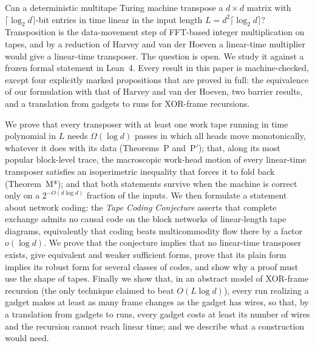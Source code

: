 Can a deterministic multitape Turing machine transpose a $d\times d$ matrix with $\lceil\log_2d\rceil$-bit
entries in time linear in the input length $L=d^2\lceil\log_2d\rceil$? Transposition is the data-movement step of FFT-based integer multiplication on tapes, and by a reduction of Harvey and van der Hoeven a
linear-time multiplier would give a linear-time transposer. The question is open. We study it against a frozen formal statement in Lean~4. Every result in this paper is machine-checked, except four explicitly marked propositions that are proved in full: the equivalence of our formulation with that of Harvey and van der Hoeven, two barrier results, and a translation from gadgets to runs for XOR-frame recursions.

We prove that every transposer with at least one work tape running in time polynomial in $L$ needs $\Omega(\log d)$ passes in which all heads
move monotonically, whatever it does with its data (Theorems~P and~P$'$); that, along its most popular block-level
trace, the macroscopic work-head motion of every linear-time transposer satisfies an isoperimetric inequality that
forces it to fold back (Theorem~M*); and that both statements survive when the
machine is correct only on a $2^{-O(d\log d)}$ fraction of the inputs. We then formulate a statement about network coding: the \emph{Tape Coding Conjecture} asserts that complete exchange admits no
causal code on the block networks of linear-length tape diagrams, equivalently that coding beats multicommodity
flow there by a factor $o(\log d)$. We prove that the conjecture implies that no linear-time transposer exists,
give equivalent and weaker sufficient forms, prove that its plain form implies its robust form for several
classes of codes, and show why a proof must use the shape of tapes. Finally we show that, in an abstract model of XOR-frame recursion (the only technique claimed to beat
$O(L\log d)$), every run realizing a gadget makes at least as many frame changes as the gadget has wires, so that, by a translation from gadgets to runs, every gadget costs at least its number of wires and the recursion cannot reach linear time; and we describe what a construction would need.
